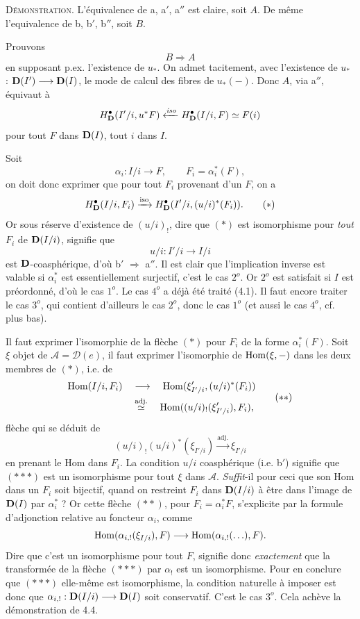\textsc{Démonstration}. L'équivalence de a, a$'$, a$''$ est claire, soit $A$. De même l'equivalence de b, b$'$, b$''$, soit $B$. %

Prouvons
\[
B \Longrightarrow A
\]
en supposant p.ex. l'existence de $u_*$. On admet tacitement, avec l'existence de $u_*$ : $\mathbf{D}(I') \longrightarrow \mathbf{D}(I)$, le mode de calcul des fibres de $u_*(-)$. Donc $A$, via a$''$, équivaut à
\[
H^{\bullet}_{\mathbf{D}}(I'/i, u^*F) \xleftarrow{\mathit{iso}} H^{\bullet}_{\mathbf{D}}(I/i, F) \simeq F(i)
\]
pour tout $F$ dans $\mathbf{D}(I)$, tout $i$ dans $I$.

Soit
\[
\alpha_i : I/i \longrightarrow F, \qquad F_i = \alpha_i^*(F), %
\]
on doit donc exprimer que pour tout $F_i$ provenant d'un $F$, on a
\[
H^{\bullet}_{\mathbf{D}}(I/i, F_i) \xrightarrow{\mathrm{iso}} H^{\bullet}_{\mathbf{D}}(I'/i, (u/i)^*(F_i)). \tag*{$(\ast)$}
\]
Or sous réserve d'existence de $(u/i)_!$, dire que $(\ast)$ est isomorphisme pour \textit{tout} $F_i$ de $\mathbf{D}(I/i)$, signifie que
\[
u/i : I'/i \longrightarrow I/i
\]
est $\mathbf{D}$-coasphérique, d'où b$'$ $\Longrightarrow$ a$''$. Il est clair que l'implication inverse est valable si $\alpha_i^*$ est essentiellement surjectif, c'est le cas $2^o$. Or $2^o$ est satisfait si $I$ est préordonné, d'où le cas $1^o$. Le cas $4^o$ a déjà été traité (4.1). Il faut encore traiter le cas $3^o$, qui contient d'ailleurs le cas $2^o$, donc le cas $1^o$ (et aussi le cas $4^o$, cf. plus bas).

Il faut exprimer l'isomorphie de la flèche $(\ast)$ pour $F_i$ de la forme $\alpha_i^*(F)$. Soit $\xi$ objet de $\mathcal{A} = \mathcal{D}(e)$, il faut exprimer l'isomorphie de $\operatorname{Hom}(\xi, -)$ dans les deux membres de $(\ast)$, i.e. de
\[
\begin{aligned}
\operatorname{Hom}(I/i, F_i) \quad &\longrightarrow \quad \operatorname{Hom}(\xi'_{I'/i}, (u/i)^*(F_i)) \\
&\overset{\text{adj.}}{\simeq} \quad \operatorname{Hom}((u/i)_!(\xi'_{I'/i}), F_i),
\end{aligned}
\tag*{$(\ast\ast)$}
\]
 flèche qui se déduit de
\[
(u/i)_!(u/i)^*(\xi_{I'/i}) \xrightarrow{\text{adj.}} \xi_{I'/i} \tag*{$(\ast\ast\ast)$}
\]
en prenant le Hom dans $F_i$. La condition $u/i$ coasphérique (i.e. b$'$) signifie que $(\ast\ast\ast)$ est un isomorphisme pour tout $\xi$ dans $\mathcal{A}$. \textit{Suffit}-il pour ceci que son Hom dans un $F_i$ soit bijectif, quand on restreint $F_i$ dans $\mathbf{D}(I/i)$ à être dans l'image de $\mathbf{D}(I)$ par $\alpha_i^*$ ? Or cette flèche $(\ast\ast)$, pour $F_i = \alpha_i^*F$, s'explicite par la formule d'adjonction relative au foncteur $\alpha_i$, comme
\[
\operatorname{Hom}(\alpha_{i,!}(\xi_{I/i}), F) \longrightarrow \operatorname{Hom}(\alpha_{i,!}(\ldots), F).
\]
Dire que c'est un isomorphisme pour tout $F$, signifie donc \textit{exactement} que la transformée de la flèche $(\ast\ast\ast)$ par $\alpha_!$ est un isomorphisme. Pour en conclure que $(\ast\ast\ast)$ elle-même est isomorphisme, la condition naturelle à imposer est donc que $\alpha_{i,!} : \mathbf{D}(I/i) \longrightarrow \mathbf{D}(I)$ soit conservatif. C'est le cas $3^o$. Cela achève la démonstration de 4.4.

